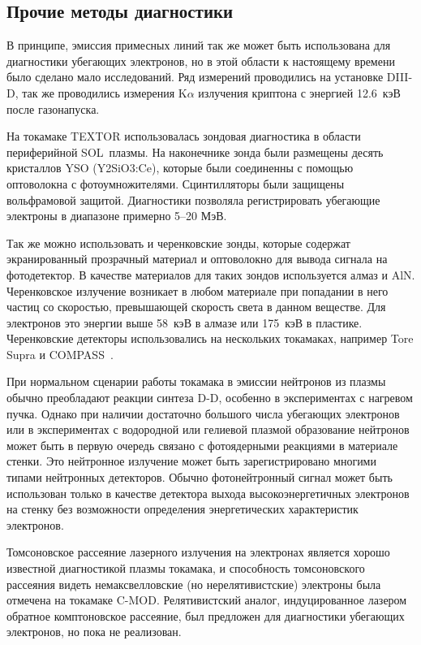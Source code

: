 
\subsection{Прочие методы диагностики}

В принципе, эмиссия примесных линий так же может быть использована для диагностики убегающих электронов, но в этой области к настоящему времени было сделано мало исследований. Ряд измерений проводились на установке \mbox{DIII-D}, так же проводились измерения K$\alpha$ излучения криптона с энергией 12.6~кэВ после газонапуска.~\cite{Breizman2019}

На токамаке TEXTOR использовалась зондовая диагностика в области периферийной SOL~плазмы. На наконечнике зонда были размещены десять кристаллов YSO (Y2SiO3:Ce), которые были соединенны с помощью оптоволокна с фотоумножителями. Сцинтилляторы были защищены вольфрамовой защитой. Диагностики позволяла регистрировать убегающие электроны в диапазоне примерно 5–20 МэВ.~\cite{Kudyakov2008} 

Так же можно использовать и черенковские зонды, которые содержат экранированный прозрачный материал и оптоволокно для вывода сигнала на фотодетектор. В качестве материалов для таких зондов используется алмаз и AlN. Черенковское излучение возникает в любом материале при попадании в него частиц со скоростью, превышающей скорость света в данном веществе. Для электронов это энергии выше 58~кэВ в алмазе или 175~кэВ в пластике. Черенковские детекторы использовались на нескольких токамаках, например Tore Supra и COMPASS~\cite{Zebrowski2018}.

При нормальном сценарии работы токамака в эмиссии нейтронов из плазмы обычно преобладают реакции синтеза D-D, особенно в экспериментах с нагревом пучка. Однако при наличии достаточно большого числа убегающих электронов или в экспериментах с водородной или гелиевой плазмой образование нейтронов может быть в первую очередь связано с фотоядерными реакциями в материале стенки. Это нейтронное излучение может быть зарегистрировано многими типами нейтронных детекторов. Обычно фотонейтронный сигнал может быть использован только в качестве детектора выхода высокоэнергетичных электронов на стенку без возможности определения энергетических характеристик электронов.~\cite{Breizman2019,Strachan1977}

Томсоновское рассеяние лазерного излучения на электронах является хорошо известной диагностикой плазмы токамака, и способность томсоновского рассеяния видеть немаксвелловские (но нерелятивистские) электроны была отмечена на токамаке C-MOD. Релятивистский аналог, индуцированное лазером обратное комптоновское рассеяние, был предложен для диагностики убегающих электронов, но пока не реализован.~\cite{Breizman2019,Pieroni1975,Wurden2014}

